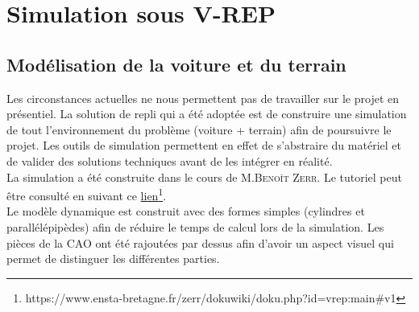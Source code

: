 \documentclass[12pt, openany]{report}
\begin{document}
\section{Simulation sous \textsc{V-REP}}
\subsection{Modélisation de la voiture et du terrain}
Les circonstances actuelles ne nous permettent pas de travailler sur le projet en présentiel. La solution de repli qui a été adoptée est de construire une simulation de tout l'environnement du problème (voiture + terrain) afin de poursuivre le projet. Les outils de simulation permettent en effet de s'abstraire du matériel et de  valider des solutions techniques avant de les intégrer en réalité.\\

La simulation a été construite dans le cours de \textsc{M.Benoît Zerr}. Le tutoriel peut être consulté en suivant ce \href{https://www.ensta-bretagne.fr/zerr/dokuwiki/doku.php?id=vrep:main#v1}{lien}\footnote{https://www.ensta-bretagne.fr/zerr/dokuwiki/doku.php?id=vrep:main#v1}.\\

Le modèle dynamique est construit avec des formes simples (cylindres et parallélépipèdes) afin de réduire le temps de calcul lors de la simulation. Les pièces de la \textsc{CAO} ont été rajoutées par dessus afin d'avoir un aspect visuel qui permet de distinguer les différentes parties.\\
\end{document}
